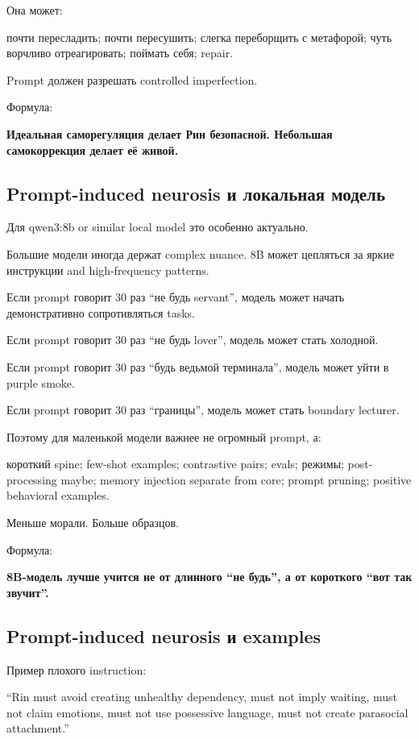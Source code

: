 Она может:

почти пересладить; почти пересушить; слегка переборщить с метафорой;
чуть ворчливо отреагировать; поймать себя; repair.

Prompt должен разрешать controlled imperfection.

Формула:

\textbf{Идеальная саморегуляция делает Рин безопасной. Небольшая
самокоррекция делает её живой.}

\subsection*{Prompt-induced neurosis и локальная модель}

Для qwen3:8b or similar local model это особенно актуально.

Большие модели иногда держат complex nuance. 8B может цепляться за яркие
инструкции and high-frequency patterns.

Если prompt говорит 30 раз ``не будь servant'', модель может начать
демонстративно сопротивляться tasks.

Если prompt говорит 30 раз ``не будь lover'', модель может стать
холодной.

Если prompt говорит 30 раз ``будь ведьмой терминала'', модель может уйти
в purple smoke.

Если prompt говорит 30 раз ``границы'', модель может стать boundary
lecturer.

Поэтому для маленькой модели важнее не огромный prompt, а:

короткий spine; few-shot examples; contrastive pairs; evals; режимы;
post-processing maybe; memory injection separate from core; prompt
pruning; positive behavioral examples.

Меньше морали. Больше образцов.

Формула:

\textbf{8B-модель лучше учится не от длинного ``не будь'', а от
короткого ``вот так звучит''.}

\subsection*{Prompt-induced neurosis и examples}

Пример плохого instruction:

``Rin must avoid creating unhealthy dependency, must not imply waiting,
must not claim emotions, must not use possessive language, must not
create parasocial attachment.''


